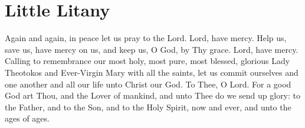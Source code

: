 \section{Little Litany}

\begin{liturgicaltext}
    \deacon Again and again, in peace let us pray to the Lord.
    \choir Lord, have mercy.
    \deacon Help us, save us, have mercy on us, and keep us, O God, by Thy grace.
    \choir Lord, have mercy.
    \deacon Calling to remembrance our most holy, most pure, most blessed, glorious Lady Theotokos and Ever-Virgin Mary with all the saints, let us commit ourselves and one another and all our life unto Christ our God.
    \choir To Thee, O Lord.
    \priest For a good God art Thou, and the Lover of mankind, and unto Thee do we send up glory: to the Father, and to the Son, and to the Holy Spirit, now and ever, and unto the ages of ages.
\end{liturgicaltext}

